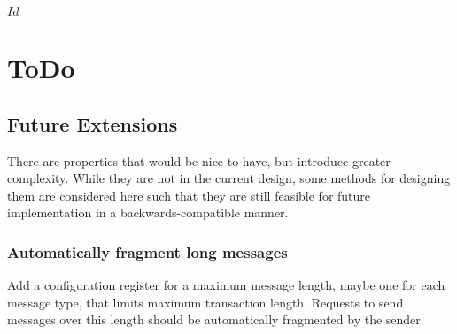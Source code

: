 \svnInfo $Id$

\section{ToDo}
\label{sec:todo}

\subsection{Future Extensions}
\label{sec:todo-extensions}
There are properties that would be nice to have, but introduce greater
complexity. While they are not in the current design, some methods for
designing them are considered here such that they are still feasible for
future implementation in a backwards-compatible manner.

\subsubsection{Automatically fragment long \proto messages}
Add a configuration register for a maximum message length, maybe one for each
message type, that limits maximum transaction length. Requests to send
messages over this length should be automatically fragmented by the sender.

